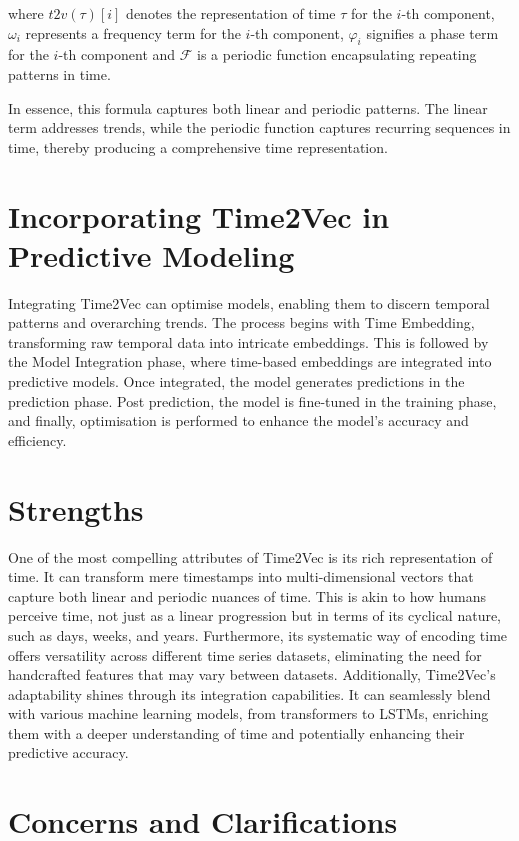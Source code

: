 \documentclass{tufte-handout}
\begin{document}
\noindent where \( t2v(\tau)[i] \) denotes the representation of time \( \tau \) for the \( i \)-th component, \( \omega_i \) represents a frequency term for the \( i \)-th component, \( \varphi_i \) signifies a phase term for the \( i \)-th component and \( \mathcal{F} \) is a periodic function encapsulating repeating patterns in time.

In essence, this formula captures both linear and periodic patterns. The linear term addresses trends, while the periodic function captures recurring sequences in time, thereby producing a comprehensive time representation.

\section{Incorporating Time2Vec in Predictive Modeling}

Integrating Time2Vec can optimise models, enabling them to discern temporal patterns and overarching trends. The process begins with Time Embedding, transforming raw temporal data into intricate embeddings. This is followed by the Model Integration phase, where time-based embeddings are integrated into predictive models. Once integrated, the model generates predictions in the prediction phase. Post prediction, the model is fine-tuned in the training phase, and finally, optimisation is performed to enhance the model's accuracy and efficiency.

\section{Strengths}

One of the most compelling attributes of Time2Vec is its rich representation of time. It can transform mere timestamps into multi-dimensional vectors that capture both linear and periodic nuances of time. This is akin to how humans perceive time, not just as a linear progression but in terms of its cyclical nature, such as days, weeks, and years. Furthermore, its systematic way of encoding time offers versatility across different time series datasets, eliminating the need for handcrafted features that may vary between datasets. Additionally, Time2Vec's adaptability shines through its integration capabilities. It can seamlessly blend with various machine learning models, from transformers to LSTMs, enriching them with a deeper understanding of time and potentially enhancing their predictive accuracy.

\section{Concerns and Clarifications}
\end{document}
